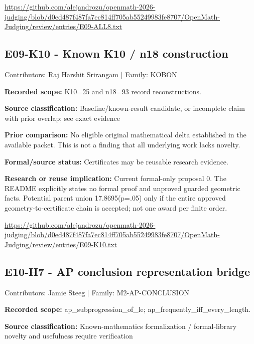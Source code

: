 \documentclass[11pt,a4paper]{article}
\begin{document}
{\small \url{https://github.com/alejandrozu/openmath-2026-judging/blob/d0ed487f487fa7ec814ff705ab55249983fe8707/OpenMath-Judging/review/entries/E09-ALL8.txt}\par}

\begin{samepage}
\subsection{E09-K10  -  Known K10 / n18 construction}
{\small Contributors: Raj Harshit Srirangam | Family: KOBON\par}

\textbf{Recorded scope:} K10=25 and n18=93 record reconstructions.

\end{samepage}
\textbf{Source classification:} Baseline/known-result candidate, or incomplete claim with prior overlap; see exact evidence

\textbf{Prior comparison:} No eligible original mathematical delta established in the available packet. This is not a finding that all underlying work lacks novelty.

\textbf{Formal/source status:} Certificates may be reusable research evidence.

\textbf{Research or reuse implication:} Current formal-only proposal 0. The README explicitly states no formal proof and unproved guarded geometric facts. Potential parent union 17.8695(p=.05) only if the entire approved geometry-to-certificate chain is accepted; not one award per finite order.

{\small \url{https://github.com/alejandrozu/openmath-2026-judging/blob/d0ed487f487fa7ec814ff705ab55249983fe8707/OpenMath-Judging/review/entries/E09-K10.txt}\par}

\begin{samepage}
\subsection{E10-H7  -  AP conclusion representation bridge}
{\small Contributors: Jamie Steeg | Family: M2-AP-CONCLUSION\par}

\textbf{Recorded scope:} ap\_subprogression\_of\_le; ap\_frequently\_iff\_every\_length.

\end{samepage}
\textbf{Source classification:} Known-mathematics formalization / formal-library novelty and usefulness require verification
\end{document}
